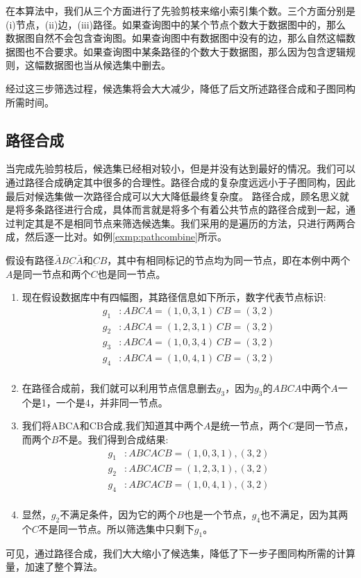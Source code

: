 \documentclass{XDBAthesis}
\numberwithin{algorithm}{chapter}
\begin{document}
    在本算法中，我们从三个方面进行了先验剪枝来缩小索引集个数。三个方面分别是(i)节点，(ii)边，(iii)路径。如果查询图中的某个节点个数大于数据图中的，那么数据图自然不会包含查询图。如果查询图中有数据图中没有的边，那么自然这幅数据图也不合要求。如果查询图中某条路径的个数大于数据图，那么因为包含逻辑规则，这幅数据图也当从候选集中删去。
    
    经过这三步筛选过程，候选集将会大大减少，降低了后文所述路径合成和子图同构所需时间。
\subsection{路径合成}
当完成先验剪枝后，候选集已经相对较小，但是并没有达到最好的情况。我们可以通过路径合成确定其中很多的合理性。路径合成的复杂度远远小于子图同构，因此最后对候选集做一次路径合成可以大大降低最终复杂度。
路径合成，顾名思义就是将多条路径进行合成，具体而言就是将多个有着公共节点的路径合成到一起，通过判定其是不是相同节点来筛选候选集。我们采用的是遍历的方法，只进行两两合成，然后逐一比对。如例\ref{exmp:pathcombine}所示。
\begin{exmp}
    假设有路径$\bar{A}B\underbar{C}\bar{A} $和$\underbar{C}B$，其中有相同标记的节点均为同一节点，即在本例中两个$A$是同一节点和两个$C$也是同一节点。
    \label{exmp:pathcombine}
    \begin{enumerate}
        \item 现在假设数据库中有四幅图，其路径信息如下所示，数字代表节点标识:
        $$
        \begin{aligned}
            g_1 &:ABCA={(1,0,3,1)}\ CB={(3,2)}\\
            g_2 &:ABCA={(1,2,3,1)}\ CB={(3,2)}\\
            g_3 &:ABCA={(1,0,3,4)}\ CB={(3,2)}\\
            g_4 &:ABCA={(1,0,4,1)}\ CB={(3,2)}\\
        \end{aligned}
        $$
        \item 在路径合成前，我们就可以利用节点信息删去$g_3$，因为$g_3$的$ABCA$中两个$A$一个是1，一个是4，并非同一节点。
        \item 我们将ABCA和CB合成,我们知道其中两个$A$是统一节点，两个$C$是同一节点，而两个$B$不是。我们得到合成结果:
        $$
        \begin{aligned}
            g_1 &:ABCACB={(1,0,3,1),(3,2)}\\
            g_2 &:ABCACB={(1,2,3,1),(3,2)}\\
            g_4 &:ABCACB={(1,0,4,1),(3,2)}\\
        \end{aligned}
        $$
        \item  显然，$g_2$不满足条件，因为它的两个$B$也是一个节点，$g_4$也不满足，因为其两个$C$不是同一节点。所以筛选集中只剩下$g_1$。
    \end{enumerate}    
\end{exmp}
可见，通过路径合成，我们大大缩小了候选集，降低了下一步子图同构所需的计算量，加速了整个算法。
\end{document}
